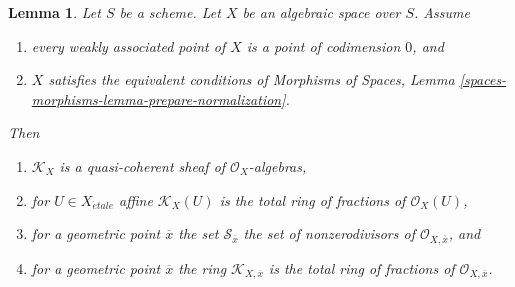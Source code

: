 \documentclass{stacks-project}
\theoremstyle{plain}
\newtheorem{lemma}[subsection]{Lemma}
\theoremstyle{definition}
\theoremstyle{remark}
\numberwithin{equation}{subsection}
\def\etale{{\acute{e}tale}}
\begin{document}
\begin{lemma}
\label{lemma-meromorphic-quasi-coherent}
Let $S$ be a scheme. Let $X$ be an algebraic space over $S$. Assume
\begin{enumerate}
\item[(a)] every weakly associated point of $X$
is a point of codimension $0$, and
\item[(b)] $X$ satisfies the equivalent conditions
of Morphisms of Spaces, Lemma
\ref{spaces-morphisms-lemma-prepare-normalization}.
\end{enumerate}
Then
\begin{enumerate}
\item $\mathcal{K}_X$ is a quasi-coherent sheaf of $\mathcal{O}_X$-algebras,
\item for $U \in X_\etale$ affine $\mathcal{K}_X(U)$
is the total ring of fractions of $\mathcal{O}_X(U)$,
\item for a geometric point $\overline{x}$ the set
$\mathcal{S}_{\overline{x}}$
the set of nonzerodivisors of $\mathcal{O}_{X, \overline{x}}$, and
\item for a geometric point $\overline{x}$ the ring
$\mathcal{K}_{X, \overline{x}}$ is the total ring of fractions of
$\mathcal{O}_{X, \overline{x}}$.
\end{enumerate}
\end{lemma}
\end{document}
